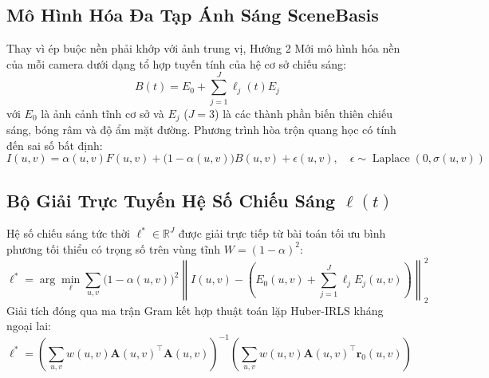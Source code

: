 \documentclass[11pt,a4paper]{article}
\begin{document}
\subsection{Mô Hình Hóa Đa Tạp Ánh Sáng SceneBasis}
Thay vì ép buộc nền phải khớp với ảnh trung vị, Hướng 2 Mới mô hình hóa nền của mỗi camera dưới dạng tổ hợp tuyến tính của hệ cơ sở chiếu sáng:
\begin{equation}
    B(t) = E_0 + \sum_{j=1}^J \ell_j(t) E_j
\end{equation}
với $E_0$ là ảnh cảnh tĩnh cơ sở và $E_j$ ($J=3$) là các thành phần biến thiên chiếu sáng, bóng râm và độ ẩm mặt đường.
Phương trình hòa trộn quang học có tính đến sai số bất định:
\begin{equation}
    I(u, v) = \alpha(u, v) F(u, v) + \big(1 - \alpha(u, v)\big) B(u, v) + \epsilon(u, v), \quad \epsilon \sim \operatorname{Laplace}(0, \sigma(u, v))
\end{equation}

\subsection{Bộ Giải Trực Tuyến Hệ Số Chiếu Sáng \texorpdfstring{$\boldsymbol{\ell}(t)$}{l(t)}}
Hệ số chiếu sáng tức thời $\boldsymbol{\ell}^* \in \mathbb{R}^J$ được giải trực tiếp từ bài toán tối ưu bình phương tối thiểu có trọng số trên vùng tĩnh $W = (1 - \alpha)^2$:
\begin{equation}
    \boldsymbol{\ell}^* = \arg\min_{\boldsymbol{\ell}} \sum_{u, v} \big(1 - \alpha(u, v)\big)^2 \left\| I(u, v) - \left(E_0(u, v) + \sum_{j=1}^J \ell_j E_j(u, v)\right) \right\|_2^2
\end{equation}
Giải tích đóng qua ma trận Gram kết hợp thuật toán lặp Huber-IRLS kháng ngoại lai:
\begin{equation}
    \boldsymbol{\ell}^* = \left( \sum_{u, v} w(u, v) \mathbf{A}(u, v)^\top \mathbf{A}(u, v) \right)^{-1} \left( \sum_{u, v} w(u, v) \mathbf{A}(u, v)^\top \mathbf{r}_0(u, v) \right)
\end{equation}
\end{document}
